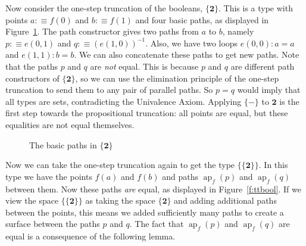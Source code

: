 \documentclass[square]{sigplanconf}
\newcommand{\bool}{\ensuremath{\mathbf{2}}}
\DeclareMathOperator{\myap}{ap}
\newcommand{\ap}[2]{\ensuremath{\myap_{#1}(#2)}}
\theoremstyle{definition}
\theoremstyle{remark}
\begin{document}
Now consider the one-step truncation of the booleans, $\{\bool\}$. This is a type with points
$a:\equiv f(0)$ and $b:\equiv f(1)$ and four basic paths, as displayed in Figure~\ref{f:tbool}. The
path constructor gives two paths from $a$ to $b$, namely $p:\equiv e(0,1)$ and
$q:\equiv(e(1,0))^{-1}$. Also, we have two loops $e(0,0) : a = a$ and $e(1,1) : b = b$. We can also
concatenate these paths to get new paths. Note that the paths $p$ and $q$ are \emph{not} equal. This
is because $p$ and $q$ are different path constructors of $\{\bool\}$, so we can use the elimination
principle of the one-step truncation to send them to any pair of parallel paths. So $p=q$ would
imply that all types are sets, contradicting the Univalence Axiom. Applying $\{{-}\}$ to $\bool$ is
the first step towards the propositional truncation: all points are equal, but these equalities are
not equal themselves.

\begin{figure}
\begin{center}
\end{center}
\caption{The basic paths in $\{\bool\}$}
\label{f:tbool}
\end{figure}

Now we can take the one-step truncation again to get the type $\{\{\bool\}\}$. In this type we have
the points $f(a)$ and $f(b)$ and paths $\ap{f}{p}$ and $\ap{f}{q}$ between them. Now these paths
\emph{are} equal, as displayed in Figure~\ref{f:ttbool}. If we view the space $\{\{\bool\}\}$ as
taking the space $\{\bool\}$ and adding additional paths between the points, this means we added
sufficiently many paths to create a surface between the paths $p$ and $q$. The fact that $\ap{f}{p}$
and $\ap{f}{q}$ are equal is a consequence of the following lemma.
\end{document}

